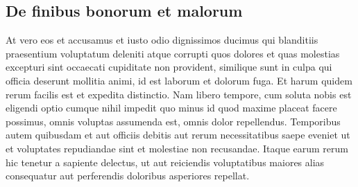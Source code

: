\subsection{De finibus bonorum et malorum
\label{reedsolomon:subsection:malorum}}
At vero eos et accusamus et iusto odio dignissimos ducimus qui
blanditiis praesentium voluptatum deleniti atque corrupti quos
dolores et quas molestias excepturi sint occaecati cupiditate non
provident, similique sunt in culpa qui officia deserunt mollitia
animi, id est laborum et dolorum fuga. Et harum quidem rerum facilis
est et expedita distinctio. Nam libero tempore, cum soluta nobis
est eligendi optio cumque nihil impedit quo minus id quod maxime
placeat facere possimus, omnis voluptas assumenda est, omnis dolor
repellendus. Temporibus autem quibusdam et aut officiis debitis aut
rerum necessitatibus saepe eveniet ut et voluptates repudiandae
sint et molestiae non recusandae. Itaque earum rerum hic tenetur a
sapiente delectus, ut aut reiciendis voluptatibus maiores alias
consequatur aut perferendis doloribus asperiores repellat.


